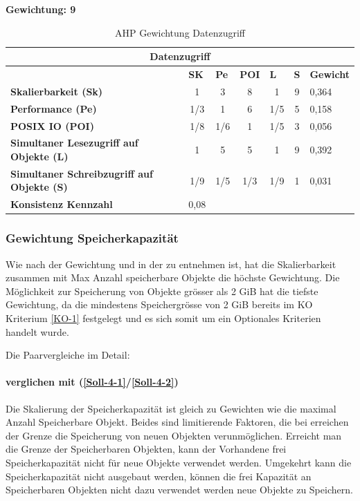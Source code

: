 \textbf{Gewichtung: 9}

\begin{table}[htbp]
\caption{AHP Gewichtung Datenzugriff}
\begin{tabular}{|l|c|c|c|c|c|l|}
\hline
\multicolumn{ 7}{|c|}{\textbf{Datenzugriff}} \\ \hline
 & \multicolumn{1}{l|}{\textbf{SK}} & \multicolumn{1}{l|}{\textbf{Pe}} & \multicolumn{1}{l|}{\textbf{POI}} & \multicolumn{1}{l|}{\textbf{L}} & \multicolumn{1}{l|}{\textbf{S  }} & \multicolumn{1}{l|}{\textbf{Gewicht}} \\ \hline
\textbf{Skalierbarkeit (Sk)} & 1 & 3 & 8 & 1 & 9 & 0,364 \\ \hline
\textbf{Performance (Pe)} & 1/3 & 1 & 6 & 1/5 & 5 & 0,158 \\ \hline
\textbf{POSIX IO (POI)} & 1/8 & 1/6 & 1 & 1/5 & 3 & 0,056 \\ \hline
\textbf{Simultaner Lesezugriff auf Objekte (L)} & 1 & 5 & 5 & 1 & 9 & 0,392 \\ \hline
\textbf{Simultaner Schreibzugriff auf Objekte (S)} & 1/9 & 1/5 & 1/3 & 1/9 & 1 & 0,031 \\ \hline
\textbf{Konsistenz Kennzahl} & 0,08  \\ \cline{1-2}
\end{tabular}
\label{tab:AHPDatenzugriff}
\end{table}

\subsubsection{Gewichtung Speicherkapazität}


Wie nach der Gewichtung und in der  zu entnehmen ist, hat die Skalierbarkeit zusammen mit Max Anzahl speicherbare Objekte die höchste Gewichtung. Die Möglichkeit zur Speicherung von Objekte grösser als 2 GiB hat die tiefste Gewichtung, da die mindestens Speichergrösse von 2 GiB bereits im KO Kriterium \ref{KO-1} festgelegt und es sich somit um ein Optionales Kriterien handelt wurde.

Die Paarvergleiche im Detail:

\paragraph*{ verglichen mit  (\ref{Soll-4-1}/\ref{Soll-4-2})}
Die Skalierung der Speicherkapazität ist gleich zu Gewichten wie die maximal Anzahl Speicherbare Objekt. Beides sind limitierende Faktoren, die bei erreichen der Grenze die Speicherung von neuen Objekten verunmöglichen. Erreicht man die Grenze der Speicherbaren Objekten,  kann der Vorhandene frei Speicherkapazität nicht für neue Objekte verwendet werden. Umgekehrt kann die Speicherkapazität nicht ausgebaut werden, können die frei Kapazität an Speicherbaren Objekten nicht dazu verwendet werden neue Objekte zu Speichern.

